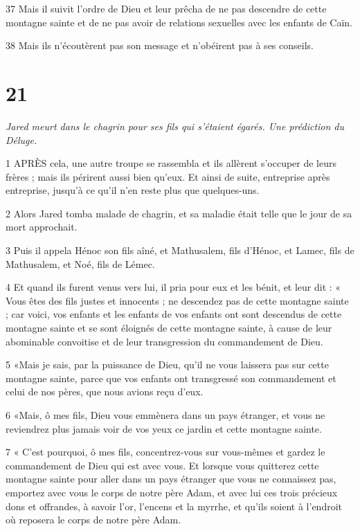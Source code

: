 \par 37 Mais il suivit l'ordre de Dieu et leur prêcha de ne pas descendre de cette montagne sainte et de ne pas avoir de relations sexuelles avec les enfants de Caïn.

\par 38 Mais ils n'écoutèrent pas son message et n'obéirent pas à ses conseils.

\chapter{21}

\par \textit{Jared meurt dans le chagrin pour ses fils qui s'étaient égarés. Une prédiction du Déluge.}

\par 1 APRÈS cela, une autre troupe se rassembla et ils allèrent s'occuper de leurs frères ; mais ils périrent aussi bien qu'eux. Et ainsi de suite, entreprise après entreprise, jusqu’à ce qu’il n’en reste plus que quelques-uns.

\par 2 Alors Jared tomba malade de chagrin, et sa maladie était telle que le jour de sa mort approchait.

\par 3 Puis il appela Hénoc son fils aîné, et Mathusalem, fils d'Hénoc, et Lamec, fils de Mathusalem, et Noé, fils de Lémec.

\par 4 Et quand ils furent venus vers lui, il pria pour eux et les bénit, et leur dit : « Vous êtes des fils justes et innocents ; ne descendez pas de cette montagne sainte ; car voici, vos enfants et les enfants de vos enfants ont sont descendus de cette montagne sainte et se sont éloignés de cette montagne sainte, à cause de leur abominable convoitise et de leur transgression du commandement de Dieu.

\par 5 «Mais je sais, par la puissance de Dieu, qu'il ne vous laissera pas sur cette montagne sainte, parce que vos enfants ont transgressé son commandement et celui de nos pères, que nous avions reçu d'eux.

\par 6 «Mais, ô mes fils, Dieu vous emmènera dans un pays étranger, et vous ne reviendrez plus jamais voir de vos yeux ce jardin et cette montagne sainte.

\par 7 « C'est pourquoi, ô mes fils, concentrez-vous sur vous-mêmes et gardez le commandement de Dieu qui est avec vous. Et lorsque vous quitterez cette montagne sainte pour aller dans un pays étranger que vous ne connaissez pas, emportez avec vous le corps de notre père Adam, et avec lui ces trois précieux dons et offrandes, à savoir l'or, l'encens et la myrrhe, et qu'ils soient à l'endroit où reposera le corps de notre père Adam.

